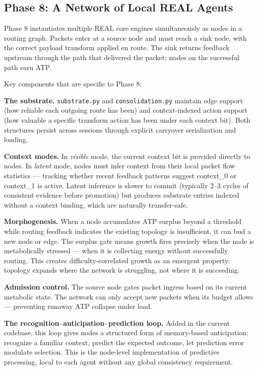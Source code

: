 \documentclass[letterpaper]{article}
\begin{document}
\subsection{Phase 8: A Network of Local REAL Agents}

Phase 8 instantiates multiple REAL core engines simultaneously as nodes in a routing graph. Packets enter at a source node and must reach a sink node, with the correct payload transform applied en route. The sink returns feedback upstream through the path that delivered the packet; nodes on the successful path earn ATP.

Key components that are specific to Phase 8:

\textbf{The substrate.} \texttt{substrate.py} and \texttt{consolidation.py} maintain edge support (how reliable each outgoing route has been) and context-indexed action support (how valuable a specific transform action has been under each context bit). Both structures persist across sessions through explicit carryover serialization and loading.

\textbf{Context modes.} In \textit{visible} mode, the current context bit is provided directly to nodes. In \textit{latent} mode, nodes must infer context from their local packet flow statistics — tracking whether recent feedback patterns suggest context\_0 or context\_1 is active. Latent inference is slower to commit (typically 2--3 cycles of consistent evidence before promotion) but produces substrate entries indexed without a context binding, which are naturally transfer-safe.

\textbf{Morphogenesis.} When a node accumulates ATP surplus beyond a threshold while routing feedback indicates the existing topology is insufficient, it can bud a new node or edge. The surplus gate means growth fires precisely when the node is metabolically stressed — when it is collecting energy without successfully routing. This creates difficulty-correlated growth as an emergent property: topology expands where the network is struggling, not where it is succeeding.

\textbf{Admission control.} The source node gates packet ingress based on its current metabolic state. The network can only accept new packets when its budget allows — preventing runaway ATP collapse under load.

\textbf{The recognition–anticipation–prediction loop.} Added in the current codebase, this loop gives nodes a structured form of memory-based anticipation: recognize a familiar context, predict the expected outcome, let prediction error modulate selection. This is the node-level implementation of predictive processing, local to each agent without any global consistency requirement.
\end{document}

